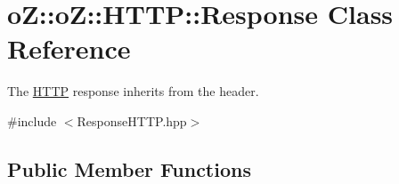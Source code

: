 \hypertarget{classo_z_1_1o_z_1_1_h_t_t_p_1_1_response}{}\section{oZ\+::oZ\+::H\+T\+TP\+::Response Class Reference}
\label{classo_z_1_1o_z_1_1_h_t_t_p_1_1_response}


The \mbox{\hyperlink{namespaceo_z_1_1o_z_1_1_h_t_t_p}{H\+T\+TP}} response inherits from the header.  




{\ttfamily \#include $<$Response\+H\+T\+T\+P.\+hpp$>$}

\subsection*{Public Member Functions}
